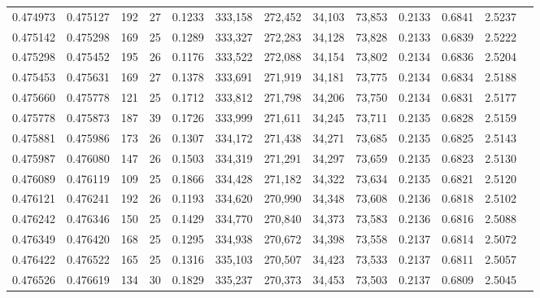 \begin{tabular}{rrrrrrrrrrrrr}
0.474973 & 0.475127 &   192 &  27 &                                     0.1233 & 333,158 & 272,452 &  34,103 &  73,853 & 0.2133 & 0.6841 & 2.5237 \\
0.475142 & 0.475298 &   169 &  25 &                                     0.1289 & 333,327 & 272,283 &  34,128 &  73,828 & 0.2133 & 0.6839 & 2.5222 \\
0.475298 & 0.475452 &   195 &  26 &                                     0.1176 & 333,522 & 272,088 &  34,154 &  73,802 & 0.2134 & 0.6836 & 2.5204 \\
0.475453 & 0.475631 &   169 &  27 &                                     0.1378 & 333,691 & 271,919 &  34,181 &  73,775 & 0.2134 & 0.6834 & 2.5188 \\
0.475660 & 0.475778 &   121 &  25 &                                     0.1712 & 333,812 & 271,798 &  34,206 &  73,750 & 0.2134 & 0.6831 & 2.5177 \\
0.475778 & 0.475873 &   187 &  39 &                                     0.1726 & 333,999 & 271,611 &  34,245 &  73,711 & 0.2135 & 0.6828 & 2.5159 \\
0.475881 & 0.475986 &   173 &  26 &                                     0.1307 & 334,172 & 271,438 &  34,271 &  73,685 & 0.2135 & 0.6825 & 2.5143 \\
0.475987 & 0.476080 &   147 &  26 &                                     0.1503 & 334,319 & 271,291 &  34,297 &  73,659 & 0.2135 & 0.6823 & 2.5130 \\
0.476089 & 0.476119 &   109 &  25 &                                     0.1866 & 334,428 & 271,182 &  34,322 &  73,634 & 0.2135 & 0.6821 & 2.5120 \\
0.476121 & 0.476241 &   192 &  26 &                                     0.1193 & 334,620 & 270,990 &  34,348 &  73,608 & 0.2136 & 0.6818 & 2.5102 \\
0.476242 & 0.476346 &   150 &  25 &                                     0.1429 & 334,770 & 270,840 &  34,373 &  73,583 & 0.2136 & 0.6816 & 2.5088 \\
0.476349 & 0.476420 &   168 &  25 &                                     0.1295 & 334,938 & 270,672 &  34,398 &  73,558 & 0.2137 & 0.6814 & 2.5072 \\
0.476422 & 0.476522 &   165 &  25 &                                     0.1316 & 335,103 & 270,507 &  34,423 &  73,533 & 0.2137 & 0.6811 & 2.5057 \\
0.476526 & 0.476619 &   134 &  30 &                                     0.1829 & 335,237 & 270,373 &  34,453 &  73,503 & 0.2137 & 0.6809 & 2.5045 \\

\end{tabular}
